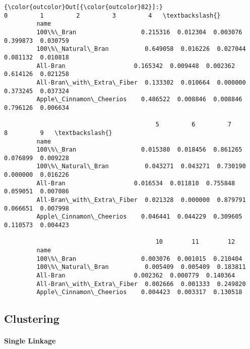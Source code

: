 \documentclass[11pt]{article}
\begin{document}
\begin{Verbatim}[commandchars=\\\{\}]
{\color{outcolor}Out[{\color{outcolor}82}]:}                                  0         1         2         3         4   \textbackslash{}
         name                                                                          
         100\%\_Bran                  0.215316  0.012304  0.003076  0.399873  0.030759   
         100\%\_Natural\_Bran          0.649058  0.016226  0.027044  0.081132  0.010818   
         All-Bran                   0.165342  0.009448  0.002362  0.614126  0.021258   
         All-Bran\_with\_Extra\_Fiber  0.133302  0.010664  0.000000  0.373245  0.037324   
         Apple\_Cinnamon\_Cheerios    0.486522  0.008846  0.008846  0.796126  0.006634   
         
                                          5         6         7         8         9   \textbackslash{}
         name                                                                          
         100\%\_Bran                  0.015380  0.018456  0.861265  0.076899  0.009228   
         100\%\_Natural\_Bran          0.043271  0.043271  0.730190  0.000000  0.016226   
         All-Bran                   0.016534  0.011810  0.755848  0.059051  0.007086   
         All-Bran\_with\_Extra\_Fiber  0.021328  0.000000  0.879791  0.066651  0.007998   
         Apple\_Cinnamon\_Cheerios    0.046441  0.044229  0.309605  0.110573  0.004423   
         
                                          10        11        12  
         name                                                     
         100\%\_Bran                  0.003076  0.001015  0.210404  
         100\%\_Natural\_Bran          0.005409  0.005409  0.183811  
         All-Bran                   0.002362  0.000779  0.140364  
         All-Bran\_with\_Extra\_Fiber  0.002666  0.001333  0.249820  
         Apple\_Cinnamon\_Cheerios    0.004423  0.003317  0.130518  
\end{Verbatim}
            
    \hypertarget{clustering}{%
\subsection{Clustering}\label{clustering}}

    \hypertarget{single-linkage}{%
\paragraph{Single Linkage}\label{single-linkage}}
\end{document}
